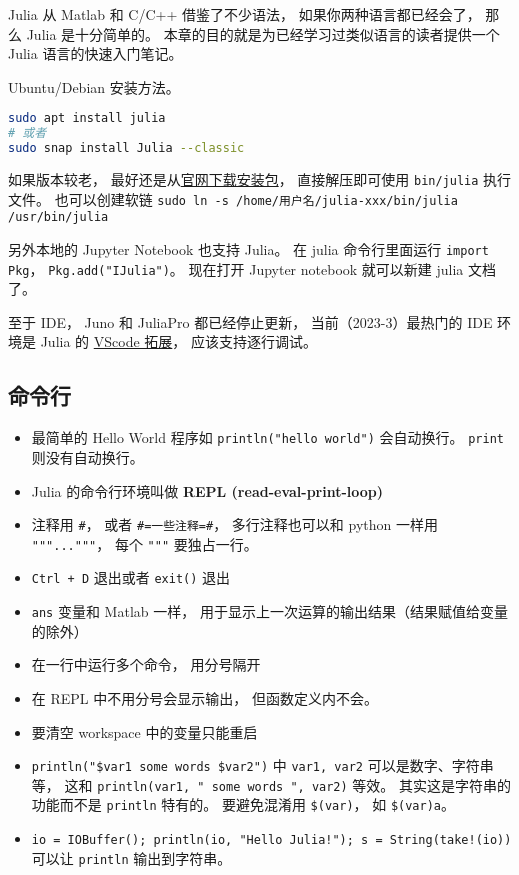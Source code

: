 
Julia 从 Matlab 和 C/C++ 借鉴了不少语法， 如果你两种语言都已经会了， 那么 Julia 是十分简单的。 本章的目的就是为已经学习过类似语言的读者提供一个 Julia 语言的快速入门笔记。

Ubuntu/Debian 安装方法。
\begin{lstlisting}[language=bash]
sudo apt install julia
# 或者
sudo snap install Julia --classic
\end{lstlisting}
如果版本较老， 最好还是从\href{https://julialang.org/downloads}{官网下载安装包}， 直接解压即可使用 \verb`bin/julia` 执行文件。 也可以创建软链 \verb`sudo ln -s /home/用户名/julia-xxx/bin/julia /usr/bin/julia`

另外本地的 Jupyter Notebook 也支持 Julia。 在 julia 命令行里面运行 \verb`import Pkg`， \verb`Pkg.add("IJulia")`。 现在打开 Jupyter notebook 就可以新建 julia 文档了。

至于 IDE， Juno 和 JuliaPro 都已经停止更新， 当前（2023-3）最热门的 IDE 环境是 Julia 的 \href{https://www.julia-vscode.org}{VScode 拓展}， 应该支持逐行调试。

\subsection{命令行}
\begin{itemize}
\item 最简单的 Hello World 程序如 \verb`println("hello world")` 会自动换行。 \verb`print` 则没有自动换行。
\item Julia 的命令行环境叫做 \textbf{REPL (read-eval-print-loop)}
\item 注释用 \verb`#`， 或者 \verb`#=一些注释=#`， 多行注释也可以和 python 一样用 \verb`"""..."""`， 每个 \verb`"""` 要独占一行。
\item \verb`Ctrl + D` 退出或者 \verb`exit()` 退出
\item \verb`ans` 变量和 Matlab 一样， 用于显示上一次运算的输出结果（结果赋值给变量的除外）
\item 在一行中运行多个命令， 用分号隔开
\item 在 REPL 中不用分号会显示输出， 但函数定义内不会。
\item 要清空 workspace 中的变量只能重启
\item \verb`println("$var1 some words $var2")` 中 \verb`var1, var2` 可以是数字、字符串等， 这和 \verb`println(var1, " some words ", var2)` 等效。 其实这是字符串的功能而不是 \verb`println` 特有的。 要避免混淆用 \verb`$(var)`， 如 \verb`$(var)a`。
\item \verb`io = IOBuffer(); println(io, "Hello Julia!"); s = String(take!(io))` 可以让 \verb`println` 输出到字符串。
\end{itemize}

